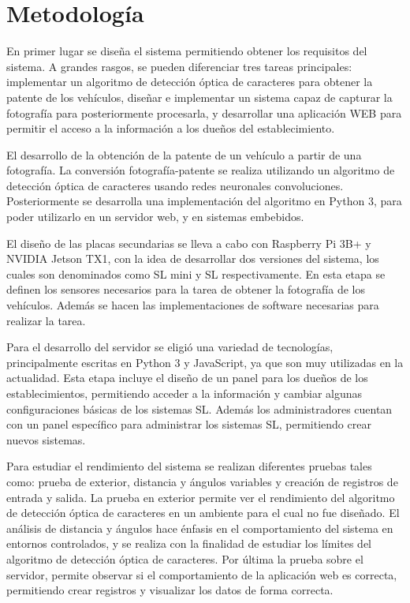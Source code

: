 \section{Metodología}

En primer lugar se diseña el sistema permitiendo obtener los requisitos del sistema. A grandes rasgos, se pueden diferenciar tres tareas principales: implementar un algoritmo de detección óptica de caracteres para obtener la patente de los vehículos, diseñar e implementar un sistema capaz de capturar la fotografía para posteriormente procesarla, y desarrollar una aplicación WEB para permitir el acceso a la información a los dueños del establecimiento.

El desarrollo de la obtención de la patente de un vehículo a partir de una fotografía. La conversión fotografía-patente se realiza utilizando un algoritmo de detección óptica de caracteres usando redes neuronales convoluciones. Posteriormente se desarrolla una implementación del algoritmo en Python 3, para poder utilizarlo en un servidor web, y en sistemas embebidos.

El diseño de las placas secundarias se lleva a cabo con Raspberry Pi 3B+ y NVIDIA Jetson TX1, con la idea de desarrollar dos versiones del sistema, los cuales son denominados como SL mini y SL respectivamente. En esta etapa se definen los sensores necesarios para la tarea de obtener la fotografía de los vehículos. Además se hacen las implementaciones de software necesarias para realizar la tarea.

Para el desarrollo del servidor se eligió una variedad de tecnologías, principalmente escritas en Python 3 y JavaScript, ya que son muy utilizadas en la actualidad. Esta etapa incluye el diseño de un panel para los dueños de los establecimientos, permitiendo acceder a la información y cambiar algunas configuraciones básicas de los sistemas SL. Además los administradores cuentan con un panel específico para administrar los sistemas SL, permitiendo crear nuevos sistemas.

Para estudiar el rendimiento del sistema se realizan diferentes pruebas tales como: prueba de exterior, distancia y ángulos variables y creación de registros de entrada y salida. La prueba en exterior permite ver el rendimiento del algoritmo de detección óptica de caracteres en un ambiente para el cual no fue diseñado. El análisis de distancia y ángulos hace énfasis en el comportamiento del sistema en entornos controlados, y se realiza con la finalidad de estudiar los límites del algoritmo de detección óptica de caracteres. Por última la prueba sobre el servidor, permite observar si el comportamiento de la aplicación web es correcta, permitiendo crear registros y visualizar los datos de forma correcta.

